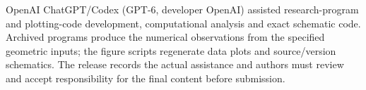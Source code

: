 OpenAI ChatGPT/Codex (GPT-6, developer OpenAI) assisted research-program and plotting-code development, computational analysis and exact schematic code. Archived programs produce the numerical observations from the specified geometric inputs; the figure scripts regenerate data plots and source/version schematics. The release records the actual assistance and authors must review and accept responsibility for the final content before submission.
